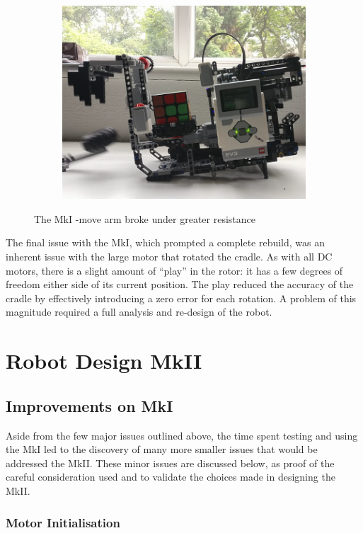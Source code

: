 \documentclass{report}
\newcommand{\move}[1]{\uppercase{\texttt{\formatmovesnospace{#1}}}-move}
\begin{document}
\begin{figure}[H]
\begin{subfigure}[b]{0.25\textwidth}
			\includegraphics[width=\textwidth]{Resources/Images/imgMkIArmCollapse3.png}
		\end{subfigure}
		\caption{The MkI \move{x} arm broke under greater resistance}
		\label{fig:mkIArmCollapse}
	\end{figure}
	
	The final issue with the MkI, which prompted a complete rebuild, was an inherent issue with the large motor that rotated the cradle. As with all DC motors, there is a slight amount of \enquote{play} in the rotor: it has a few degrees of freedom either side of its current position. The play reduced the accuracy of the cradle by effectively introducing a zero error for each rotation. A problem of this magnitude required a full analysis and re-design of the robot.

    \section{Robot Design MkII}
	\subsection{Improvements on MkI}
	Aside from the few major issues outlined above, the time spent testing and using the MkI led to the discovery of many more smaller issues that would be addressed the MkII. These minor issues are discussed below, as proof of the careful consideration used and to validate the choices made in designing the MkII.
	
	\subsubsection{Motor Initialisation}
	
\end{document}
